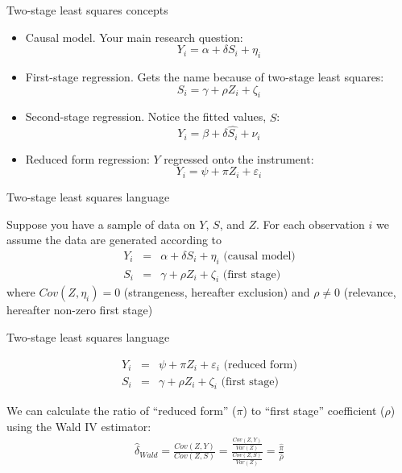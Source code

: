 \documentclass{beamer}
\begin{document}
\begin{frame}{Two-stage least squares concepts}
	
	\begin{itemize}
	\item Causal model.  Your main research question:$$Y_i=\alpha + \delta{S_i} + \eta_i$$
	\item First-stage regression. Gets the name because of two-stage least squares:$$S_i = \gamma + \rho{Z_i} + \zeta_i$$
	\item Second-stage regression. Notice the fitted values, $\widehat{S}$:$$Y_i=\beta + \delta{\widehat{S_i}}+\nu_i$$
	\item Reduced form regression: $Y$ regressed onto the instrument:$$Y_i=\psi + \pi{Z_i} + \varepsilon_i$$
	\end{itemize}
\end{frame}








\begin{frame}{Two-stage least squares language}

Suppose you have a sample of data on $Y$, $S$, and $Z$. For each observation $i$ we assume the data are generated according to
		\begin{eqnarray*}
		Y_i &=& \alpha + \delta{S}_i + \eta_i \text{ (causal model)}\\
		S_i &=& \gamma + \rho{Z}_i + \zeta_i \text{ (first stage)} 
		\end{eqnarray*}where $Cov(Z,\eta_i)=0$ (strangeness, hereafter exclusion) and $\rho\neq{0}$ (relevance, hereafter non-zero first stage)

\end{frame}

\begin{frame}{Two-stage least squares language}

		\begin{eqnarray*}
		Y_i&=&\psi + \pi{Z_i} + \varepsilon_i \text{ (reduced form)} \\
		S_i &=& \gamma + \rho{Z}_i + \zeta_i \text{ (first stage)} 
		\end{eqnarray*}
		
		\bigskip
		
We can calculate the ratio of ``reduced form'' ($\pi$) to ``first stage'' coefficient ($\rho$) using the Wald IV estimator:
		\begin{eqnarray*}
		\widehat{\delta}_{Wald} = \frac{ Cov(Z,Y)} {Cov(Z,S)} = \frac{ \frac{Cov(Z,Y)}{Var(Z)}}{ \frac{Cov(Z,S)}{Var(Z)}} = \frac{\widehat{\pi}}{\widehat{\rho}}
		\end{eqnarray*}

\end{frame}
\end{document}
